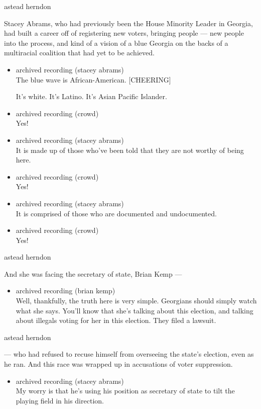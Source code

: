 astead herndon

Stacey Abrams, who had previously been the House Minority Leader in
Georgia, had built a career off of registering new voters, bringing
people --- new people into the process, and kind of a vision of a blue
Georgia on the backs of a multiracial coalition that had yet to be
achieved.

\begin{itemize}
\item
  archived recording (stacey abrams)\\
  The blue wave is African-American. {[}CHEERING{]}

  It's white. It's Latino. It's Asian Pacific Islander.
\item
  archived recording (crowd)\\
  Yes!
\item
  archived recording (stacey abrams)\\
  It is made up of those who've been told that they are not worthy of
  being here.
\item
  archived recording (crowd)\\
  Yes!
\item
  archived recording (stacey abrams)\\
  It is comprised of those who are documented and undocumented.
\item
  archived recording (crowd)\\
  Yes!
\end{itemize}

astead herndon

And she was facing the secretary of state, Brian Kemp ---

\begin{itemize}
\tightlist
\item
  archived recording (brian kemp)\\
  Well, thankfully, the truth here is very simple. Georgians should
  simply watch what she says. You'll know that she's talking about this
  election, and talking about illegals voting for her in this election.
  They filed a lawsuit.
\end{itemize}

astead herndon

--- who had refused to recuse himself from overseeing the state's
election, even as he ran. And this race was wrapped up in accusations of
voter suppression.

\begin{itemize}
\tightlist
\item
  archived recording (stacey abrams)\\
  My worry is that he's using his position as secretary of state to tilt
  the playing field in his direction.
\end{itemize}

